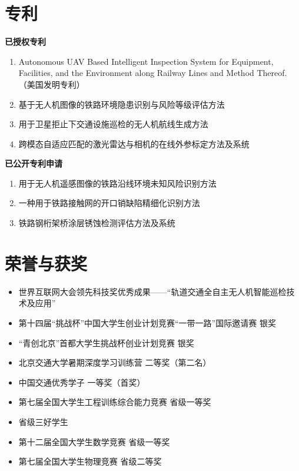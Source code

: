 \documentclass[11pt,a4paper]{ctexart}
\begin{document}
\section{专利}

\noindent\textbf{已授权专利}

\begin{enumerate}[leftmargin=*,nosep,itemsep=2pt]
  \item Autonomous UAV Based Intelligent Inspection System for Equipment, Facilities, and the Environment along Railway Lines and Method Thereof.（美国发明专利）
  \item 基于无人机图像的铁路环境隐患识别与风险等级评估方法
  \item 用于卫星拒止下交通设施巡检的无人机航线生成方法
  \item 跨模态自适应匹配的激光雷达与相机的在线外参标定方法及系统
\end{enumerate}

\noindent\textbf{已公开专利申请}

\begin{enumerate}[leftmargin=*,nosep,itemsep=2pt]
  \item 用于无人机遥感图像的铁路沿线环境未知风险识别方法
  \item 一种用于铁路接触网的开口销缺陷精细化识别方法
  \item 铁路钢桁架桥涂层锈蚀检测评估方法及系统
\end{enumerate}

\section{荣誉与获奖}

\begin{itemize}[leftmargin=*,nosep,itemsep=2pt]
  \item[2024] 世界互联网大会领先科技奖优秀成果——“轨道交通全自主无人机智能巡检技术及应用”
  \item[2024] 第十四届“挑战杯”中国大学生创业计划竞赛“一带一路”国际邀请赛 银奖
  \item[2024] “青创北京”首都大学生挑战杯创业计划竞赛 银奖
  \item[2022] 北京交通大学暑期深度学习训练营 二等奖（第二名）
  \item[2021] 中国交通优秀学子 一等奖（首奖）
  \item[2021] 第七届全国大学生工程训练综合能力竞赛 省级一等奖
  \item[2021] 省级三好学生
  \item[2020] 第十二届全国大学生数学竞赛 省级一等奖
  \item[2020] 第七届全国大学生物理竞赛 省级二等奖
\end{itemize}
\end{document}
